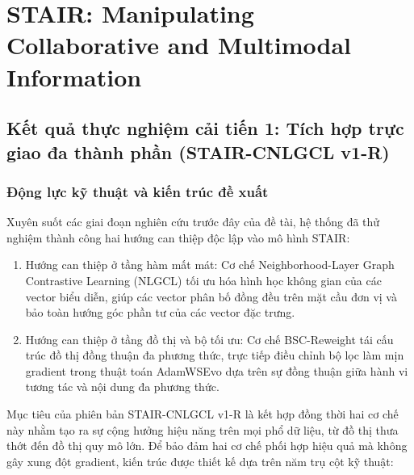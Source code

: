 \section{STAIR: Manipulating Collaborative and Multimodal Information}

\subsection{Kết quả thực nghiệm cải tiến 1: Tích hợp trực giao đa thành phần (STAIR-CNLGCL v1-R)}
\label{sec:stair_cnlgcl_v1_r}

\subsubsection{Động lực kỹ thuật và kiến trúc đề xuất}

Xuyên suốt các giai đoạn nghiên cứu trước đây của đề tài, hệ thống đã thử nghiệm thành công hai hướng can thiệp độc lập vào mô hình STAIR:
\begin{enumerate}[leftmargin=*]
    \item Hướng can thiệp ở tầng hàm mất mát: Cơ chế Neighborhood-Layer Graph Contrastive Learning (NLGCL) tối ưu hóa hình học không gian của các vector biểu diễn, giúp các vector phân bố đồng đều trên mặt cầu đơn vị và bảo toàn hướng góc phần tư của các vector đặc trưng.
    \item Hướng can thiệp ở tầng đồ thị và bộ tối ưu: Cơ chế BSC-Reweight tái cấu trúc đồ thị đồng thuận đa phương thức, trực tiếp điều chỉnh bộ lọc làm mịn gradient trong thuật toán AdamWSEvo dựa trên sự đồng thuận giữa hành vi tương tác và nội dung đa phương thức.
\end{enumerate}

Mục tiêu của phiên bản STAIR-CNLGCL v1-R là kết hợp đồng thời hai cơ chế này nhằm tạo ra sự cộng hưởng hiệu năng trên mọi phổ dữ liệu, từ đồ thị thưa thớt đến đồ thị quy mô lớn. Để bảo đảm hai cơ chế phối hợp hiệu quả mà không gây xung đột gradient, kiến trúc được thiết kế dựa trên năm trụ cột kỹ thuật:

